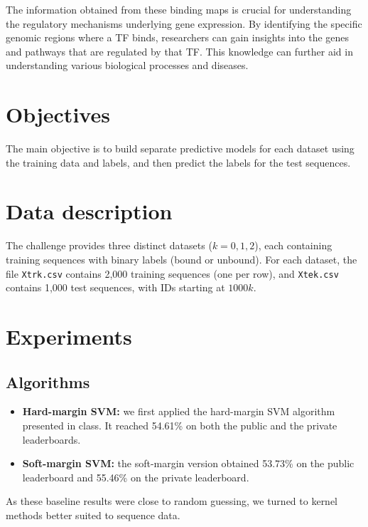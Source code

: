\documentclass[times,5p, twocolumn]{elsarticle}
\begin{document}
The information obtained from these binding maps is crucial for understanding the regulatory mechanisms underlying gene expression. By identifying the specific genomic regions where a TF binds, researchers can gain insights into the genes and pathways that are regulated by that TF. This knowledge can further aid in understanding various biological processes and diseases.

\section{Objectives}
The main objective is to build separate predictive models for each dataset using the training data and labels, and then predict the labels for the test sequences.
\section{Data description}

The challenge provides three distinct datasets ($k = 0, 1, 2$), each containing training sequences with binary labels (bound or unbound). For each dataset, the file \texttt{Xtrk.csv} contains 2,000 training sequences (one per row), and \texttt{Xtek.csv} contains 1,000 test sequences, with IDs starting at $1000k$.

\section{Experiments}
\subsection{Algorithms}
\begin{itemize}
    \item \textbf{Hard-margin SVM:} we first applied the hard-margin SVM algorithm presented in class. It reached 54.61\% on both the public and the private leaderboards.
    \item \textbf{Soft-margin SVM:} the soft-margin version obtained 53.73\% on the public leaderboard and 55.46\% on the private leaderboard.
\end{itemize}
As these baseline results were close to random guessing, we turned to kernel methods better suited to sequence data.
\end{document}
